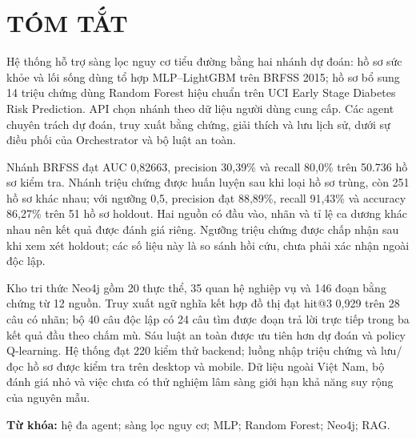 \documentclass[12pt,a4paper]{report}
\begin{document}
\setcounter{page}{2}

\chapter*{TÓM TẮT}
Hệ thống hỗ trợ sàng lọc nguy cơ tiểu đường bằng hai nhánh dự đoán: hồ sơ sức khỏe và lối sống dùng tổ hợp MLP--LightGBM trên BRFSS 2015; hồ sơ bổ sung 14 triệu chứng dùng Random Forest hiệu chuẩn trên UCI Early Stage Diabetes Risk Prediction. API chọn nhánh theo dữ liệu người dùng cung cấp. Các agent chuyên trách dự đoán, truy xuất bằng chứng, giải thích và lưu lịch sử, dưới sự điều phối của Orchestrator và bộ luật an toàn.

Nhánh BRFSS đạt AUC 0,82663, precision 30,39\% và recall 80,0\% trên 50.736 hồ sơ kiểm tra. Nhánh triệu chứng được huấn luyện sau khi loại hồ sơ trùng, còn 251 hồ sơ khác nhau; với ngưỡng 0,5, precision đạt 88,89\%, recall 91,43\% và accuracy 86,27\% trên 51 hồ sơ holdout. Hai nguồn có đầu vào, nhãn và tỉ lệ ca dương khác nhau nên kết quả được đánh giá riêng. Ngưỡng triệu chứng được chấp nhận sau khi xem xét holdout; các số liệu này là so sánh hồi cứu, chưa phải xác nhận ngoài độc lập.

Kho tri thức Neo4j gồm 20 thực thể, 35 quan hệ nghiệp vụ và 146 đoạn bằng chứng từ 12 nguồn. Truy xuất ngữ nghĩa kết hợp đồ thị đạt hit@3 0,929 trên 28 câu có nhãn; bộ 40 câu độc lập có 24 câu tìm được đoạn trả lời trực tiếp trong ba kết quả đầu theo chấm mù. Sáu luật an toàn được ưu tiên hơn dự đoán và policy Q-learning. Hệ thống đạt 220 kiểm thử backend; luồng nhập triệu chứng và lưu/đọc hồ sơ được kiểm tra trên desktop và mobile. Dữ liệu ngoài Việt Nam, bộ đánh giá nhỏ và việc chưa có thử nghiệm lâm sàng giới hạn khả năng suy rộng của nguyên mẫu.

\textbf{Từ khóa:} hệ đa agent; sàng lọc nguy cơ; MLP; Random Forest; Neo4j; RAG.
\clearpage

\tableofcontents
\clearpage

\end{document}
